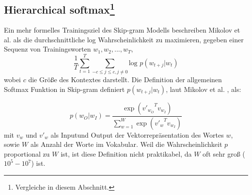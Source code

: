 \documentclass[12pt,a4paper]{report}
\begin{document}
\subsection*{Hierarchical softmax\footnote{Vergleiche \cite{DBLP:journals/corr/MikolovSCCD13} in diesem Abschnitt.}}
Ein mehr formelles Trainingsziel des Skip-gram Modells beschreiben Mikolov et al.\cite{DBLP:journals/corr/MikolovSCCD13} als die durchschnittliche log Wahrscheinlichkeit zu maximieren, gegeben einer Sequenz von Trainingsworten $w_1, w_2,...,w_T$,\\
 \begin{equation}
\frac{1}{T} \sum_{t=1}^T \sum_{-c \le j \le c, j \neq 0} \textrm{log } p(w_{t+j}|w_t) 
  \end{equation}
  wobei $c$ die Größe des Kontextes darstellt\citep{DBLP:journals/corr/MikolovSCCD13}. Die Definition der allgemeinen Softmax Funktion in Skip-gram definiert $p(w_{t+j}|w_t)$, laut Mikolov et al. \cite{DBLP:journals/corr/MikolovSCCD13}, als:
  
 \begin{equation}
p(w_O|w_I)=\frac{\exp({v'_{w_O}}^T v_{w_I}) }{\sum_{w=1}^W \exp({v'_w}^{T} v_{w_I})} 
  \end{equation}
  mit $v_w$ und $v'_w$ als \glqq Input\grqq und \glqq Output\grqq{} der Vektorrepräsentation des Wortes $w$, sowie $W$ als Anzahl der Worte im Vokabular. Weil die Wahrscheinlichkeit $p$ proportional zu $W$ ist, ist diese Definition nicht praktikabel, da $W$ oft sehr groß ($10^5 - 10^7$) ist\cite{DBLP:journals/corr/MikolovSCCD13}.\\
  
\end{document}
